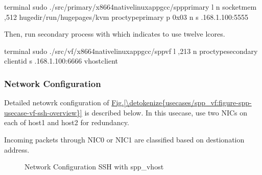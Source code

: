 \documentclass[a4paper,11pt,openany,oneside,english]{sphinxmanual}
\begin{document}
\begin{sphinxVerbatim}[commandchars=\\\{\},formatcom=\footnotesize]
 terminal 
 sudo ./src/primary/x86\PYGZus{}64\PYGZhy{}native\PYGZhy{}linuxapp\PYGZhy{}gcc/spp\PYGZus{}primary 
    \PYGZhy{}l  \PYGZhy{}n  
    \PYGZhy{}\PYGZhy{}socket\PYGZhy{}mem ,512 
    \PYGZhy{}\PYGZhy{}huge\PYGZhy{}dir/run/hugepages/kvm 
    \PYGZhy{}\PYGZhy{}proc\PYGZhy{}typeprimary 
    \PYGZhy{}\PYGZhy{} 
    \PYGZhy{}p 0x03 \PYGZhy{}n  \PYGZhy{}s .168.1.100:5555
\end{sphinxVerbatim}

Then, run secondary process  with  which indicates
to use twelve lcores.

\begin{sphinxVerbatim}[commandchars=\\\{\},formatcom=\footnotesize]
 terminal 
 sudo ./src/vf/x86\PYGZus{}64\PYGZhy{}native\PYGZhy{}linuxapp\PYGZhy{}gcc/spp\PYGZus{}vf 
    \PYGZhy{}l ,2\PYGZhy{}13 
    \PYGZhy{}n  \PYGZhy{}\PYGZhy{}proc\PYGZhy{}typesecondary 
    \PYGZhy{}\PYGZhy{} 
    \PYGZhy{}\PYGZhy{}client\PYGZhy{}id  
    \PYGZhy{}s .168.1.100:6666 \PYGZhy{}\PYGZhy{}vhost\PYGZhy{}client
\end{sphinxVerbatim}


\subsubsection{Network Configuration}
\label{\detokenize{usecases/spp_vf:id2}}
Detailed netowrk configuration of \hyperref[\detokenize{usecases/spp_vf:figure-spp-usecase-vf-ssh-overview}]{Fig.\@ \ref{\detokenize{usecases/spp_vf:figure-spp-usecase-vf-ssh-overview}}}
is described below.
In this usecase, use two NICs on each of host1 and host2 for redundancy.

Incoming packets through NIC0 or NIC1 are classified based on destionation
address.

\begin{figure}[htbp]
\centering
\capstart

\noindent{}
\caption{Network Configuration SSH with spp\_vhost}\label{\detokenize{usecases/spp_vf:id6}}\label{\detokenize{usecases/spp_vf:figure-network-config}}\end{figure}
\end{document}
